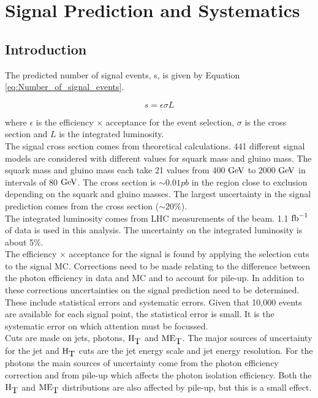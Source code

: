 \chapter{Signal Prediction and Systematics}

\section{Introduction}

The predicted number of signal events, s, is given by Equation
\ref{eq:Number_of_signal_events}.

\begin{equation}
s = \epsilon \sigma L
\label{eq:Number_of_signal_events}
\end{equation}

where $\epsilon$ is the efficiency $\times$ acceptance for the event selection,
$\sigma$ is the cross section and $L$ is the integrated luminosity. \\

The signal cross section comes from theoretical calculations. 441 different
signal models are considered with different values for squark mass and gluino 
mass. The squark mass and gluino mass each take 21 values from 400 $\mbox{GeV}$ to 
2000 $\mbox{GeV}$ in intervals of 80 $\mbox{GeV}$. The cross section is $\sim 0.01 pb$ 
in the region close to exclusion depending on the squark and gluino masses. The 
largest uncertainty in the signal prediction comes from the cross section 
($\sim 20\%$). \\

The integrated luminosity comes from LHC measurements of the beam. 1.1 $\mbox{fb}^{-1}$
of data is used in this analysis. The uncertainty on the integrated luminosity
is about 5\%. \\

The efficiency $\times$ acceptance for the signal is found by applying the 
selection cuts to the signal MC. Corrections need to be made relating to the 
difference between the photon efficiency in data and MC and to account for 
pile-up. In addition to these corrections uncertainties on the signal prediction
need to be determined. These include statistical errors and systematic errors. 
Given that 10,000 events are available for each signal point, the statistical 
error is small. It is the systematic error on which attention must be focussed. 
\\

Cuts are made on jets, photons, $\mbox{H}_{\mbox{T}}$ and $\mbox{ME}_{\mbox{T}}$. The major sources of
uncertainty for the jet and $\mbox{H}_{\mbox{T}}$ cuts are the jet energy scale and jet energy 
resolution. For the photons the main sources of uncertainty come from the photon
efficiency correction and from pile-up which affects the photon isolation 
efficiency. Both the $\mbox{H}_{\mbox{T}}$ and $\mbox{ME}_{\mbox{T}}$ distributions are also affected by 
pile-up, but this is a small effect.

